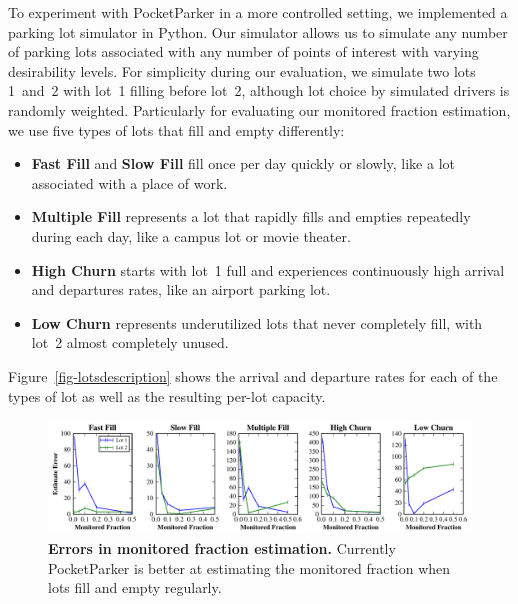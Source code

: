 To experiment with PocketParker in a more controlled setting, we implemented
a parking lot simulator in Python. Our simulator allows us to simulate any
number of parking lots associated with any number of points of interest with
varying desirability levels. For simplicity during our evaluation, we
simulate two lots 1~and~2 with lot~1 filling before lot~2, although lot
choice by simulated drivers is randomly weighted. Particularly for evaluating
our monitored fraction estimation, we use five types of lots that fill and
empty differently:

\begin{itemize}

\item \textbf{Fast Fill} and \textbf{Slow Fill} fill once per day quickly or
slowly, like a lot associated with a place of work.

\item \textbf{Multiple Fill} represents a lot that rapidly fills and empties
repeatedly during each day, like a campus lot or movie theater.

\item \textbf{High Churn} starts with lot~1 full and experiences continuously
high arrival and departures rates, like an airport parking lot.

\item \textbf{Low Churn} represents underutilized lots that never completely
fill, with lot~2 almost completely unused.

\end{itemize}

Figure~\ref{fig-lotsdescription} shows the arrival and departure rates for
each of the types of lot as well as the resulting per-lot capacity.

\begin{figure}
\centering
\includegraphics[width=\textwidth]{./simulator/figures/capacity_experiment.pdf}

\caption{\textbf{Errors in monitored fraction estimation.} Currently
PocketParker is better at estimating the monitored fraction when lots fill
and empty regularly.}

\label{fig-capacityerrors}
\end{figure}

